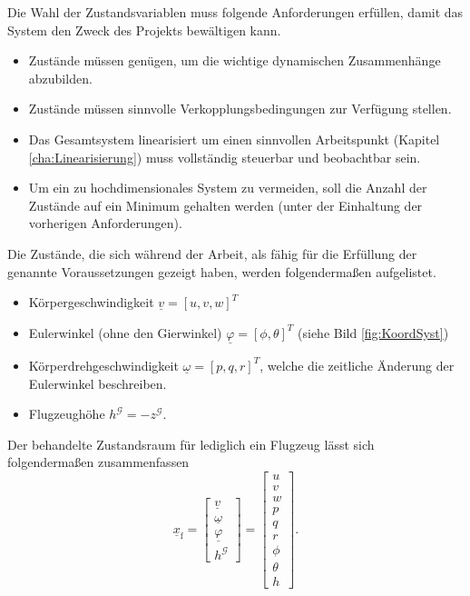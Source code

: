 Die Wahl der Zustandsvariablen muss folgende Anforderungen erfüllen, damit das System den Zweck des Projekts bewältigen kann.
\begin{itemize}
\item Zustände müssen genügen, um die wichtige dynamischen Zusammenhänge abzubilden. 
\item Zustände müssen sinnvolle Verkopplungsbedingungen zur Verfügung stellen.
\item Das Gesamtsystem linearisiert um einen sinnvollen Arbeitspunkt (Kapitel \ref{cha:Linearisierung}) muss vollständig steuerbar und beobachtbar sein.
\item Um ein zu hochdimensionales System zu vermeiden, soll die Anzahl der Zustände auf ein Minimum gehalten werden (unter der Einhaltung der vorherigen Anforderungen). 
\end{itemize}
Die Zustände, die sich während der Arbeit, als fähig für die Erfüllung der genannte Voraussetzungen gezeigt haben, werden folgendermaßen aufgelistet.
\begin{itemize}
\item Körpergeschwindigkeit $\underline{v} = [u, v, w]^T$
\item Eulerwinkel (ohne den Gierwinkel) $\underline{\varphi} = [\phi, \theta]^T$ (siehe Bild \ref{fig:KoordSyst})
\item Körperdrehgeschwindigkeit $\underline{\omega} = [p, q, r]^T$, welche die zeitliche Änderung der Eulerwinkel beschreiben.
\item Flugzeughöhe $h^\mathcal{G} = -z^\mathcal{G}$.
\end{itemize}
Der behandelte Zustandsraum für lediglich ein Flugzeug lässt sich folgendermaßen zusammenfassen\\
\begin{equation}
\underline{x}_\mathrm{f} = \begin{bmatrix} 
\underline{v} \\
\underline{\omega} \\
\underline{\varphi}\\
h^\mathcal{G}
\end{bmatrix} = \begin{bmatrix} 
u\\v\\w\\p\\q\\r\\ \phi\\ \theta\\ h
\end{bmatrix}.
\end{equation}

